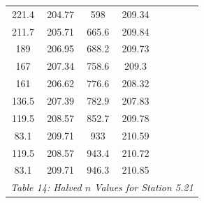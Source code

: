 \begin{center}
\begin{tabular}{|cccc||cc||cc|}
    221.4    & 204.77                  & 598   & 209.34                       &        &                             &          &                                    \\
    211.7    & 205.71                  & 665.6 & 209.84                       &        &                             &          &                                    \\
    189      & 206.95                  & 688.2 & 209.73                       &        &                             &          &                                    \\
    167      & 207.34                  & 758.6 & 209.3                        &        &                             &          &                                    \\
    161      & 206.62                  & 776.6 & 208.32                       &        &                             &          &                                    \\
    136.5    & 207.39                  & 782.9 & 207.83                       &        &                             &          &                                    \\
    119.5    & 208.57                  & 852.7 & 209.78                       &        &                             &          &                                    \\
    83.1     & 209.71                  & 933   & 210.59                       &        &                             &          &                                    \\
    119.5    & 208.57                  & 943.4 & 210.72                       &        &                             &          &                                    \\
    83.1     & 209.71                  & 946.3 & 210.85                       &        &                             &          &                                    \\
    \hline\multicolumn{8}{c}{\emph{Table 14: Halved $n$ Values for Station 5.21}}
\end{tabular}



\end{center}

